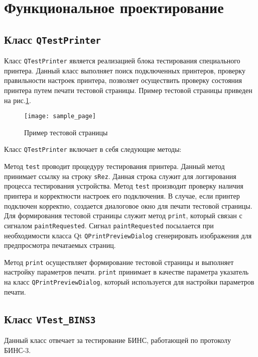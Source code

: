 \section{Функциональное проектирование}
\label{sec:func}

\subsection{Класс \texttt{QTestPrinter}}
Класс \texttt{QTestPrinter} является реализацией блока тестирования специального принтера.
Данный класс выполняет поиск подключенных принтеров, проверку правильности настроек принтера,
позволяет осуществить проверку состояния принтера путем печати тестовой страницы. Пример тестовой страницы приведен на
рис.\ref{fig:func:sample_page}.
\begin{figure}[!htb]
	\centering
	\texttt{[image: sample\_page]}
	\caption{Пример тестовой страницы}
	\label{fig:func:sample_page}
\end{figure}

Класс \texttt{QTestPrinter} включает в себя следующие методы:

\begin{enum}
	\item Метод \texttt{test} проводит процедуру тестирования принтера. Данный метод принимает ссылку на строку
		\texttt{sRez}. Данная строка служит для логгирования процесса тестирования устройства. Метод \texttt{test} производит
		проверку наличия принтера и корректности настроек его подключения. В случае, если принтер подключен корректно, создается
		диалоговое окно для печати тестовой страницы. Для формирования тестовой страницы служит метод \texttt{print}, который
		связан с сигналом \texttt{paintRequested}. Сигнал \texttt{paintRequested} посылается при необходимости
		класса Qt \texttt{QPrintPreviewDialog} сгенерировать изображения для предпросмотра печатаемых страниц.

	\item Метод \texttt{print} осуществляет формирование тестовой страницы и выполняет настройку параметров печати. \texttt{print}
		принимает в качестве параметра указатель на класс \texttt{QPrintPreviewDialog}, который используется для настройки
		параметров печати.
\end{enum}

\subsection{Класс \texttt{VTest\_BINS3}}
Данный класс отвечает за тестирование БИНС, работающей по протоколу БИНС-3.


